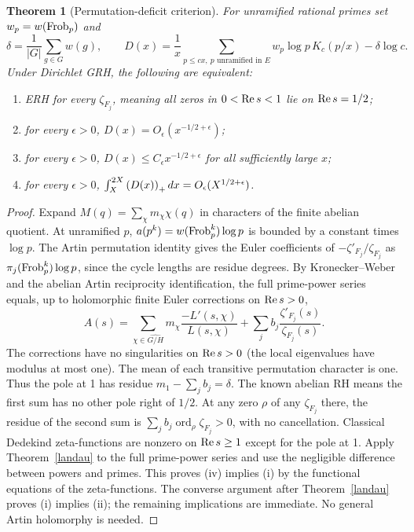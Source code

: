 \documentclass[11pt]{article}
\newtheorem{theorem}{Theorem}[section]
\theoremstyle{definition}\newtheorem{definition}[theorem]{Definition}
\begin{document}
\begin{theorem}[Permutation-deficit criterion]\label{perm}
For unramified rational primes set $w_p=w(\operatorname{Frob}_p)$ and
\[
 \delta=\frac{1}{|G|}\sum_{g\in G}w(g),\qquad
 D(x)=\frac1x\sum_{p\le cx,\ p\text{ unramified in }E} w_p\log p\,K_c(p/x)-\delta\log c.
\]
Under Dirichlet GRH, the following are equivalent:
\begin{enumerate}[label=(\roman*)]
\item ERH for every $\zeta_{F_j}$, meaning all zeros in $0<\operatorname{Re} s<1$ lie on $\operatorname{Re} s=1/2$;
\item for every $\epsilon>0$, $D(x)=O_\epsilon(x^{-1/2+\epsilon})$;
\item for every $\epsilon>0$, $D(x)\le C_\epsilon x^{-1/2+\epsilon}$ for all sufficiently large $x$;
\item for every $\epsilon>0$, $\int_X^{2X}\left(D(x)\right)_+dx=O_\epsilon(X^{1/2+\epsilon})$.
\end{enumerate}
\end{theorem}
\begin{proof}
Expand $M(q)=\sum_\chi m_\chi\chi(q)$ in characters of the finite abelian quotient. At unramified $p$, $a(p^k)=w(\operatorname{Frob}_p^k)\log p$ is bounded by a constant times $\log p$. The Artin permutation identity gives the Euler coefficients of $-\zeta'_{F_j}/\zeta_{F_j}$ as $\pi_j(\operatorname{Frob}_p^k)\log p$, since the cycle lengths are residue degrees. By Kronecker--Weber and the abelian Artin reciprocity identification, the full prime-power series equals, up to holomorphic finite Euler corrections on $\operatorname{Re} s>0$,
\[
 A(s)=\sum_{\chi\in\widehat{G/H}}m_\chi\frac{-L'(s,\chi)}{L(s,\chi)}
      +\sum_j b_j\frac{\zeta'_{F_j}(s)}{\zeta_{F_j}(s)}.
\]
The corrections have no singularities on $\operatorname{Re} s>0$ (the local eigenvalues have modulus at most one). The mean of each transitive permutation character is one. Thus the pole at 1 has residue $m_1-\sum_j b_j=\delta$. The known abelian RH means the first sum has no other pole right of $1/2$. At any zero $\rho$ of any $\zeta_{F_j}$ there, the residue of the second sum is $\sum_j b_j\operatorname{ord}_\rho\zeta_{F_j}>0$, with no cancellation. Classical Dedekind zeta-functions are nonzero on $\operatorname{Re} s\ge1$ except for the pole at 1. Apply Theorem~\ref{landau} to the full prime-power series and use the negligible difference between powers and primes. This proves (iv) implies (i) by the functional equations of the zeta-functions. The converse argument after Theorem~\ref{landau} proves (i) implies (ii); the remaining implications are immediate. No general Artin holomorphy is needed.
\end{proof}
\end{document}
